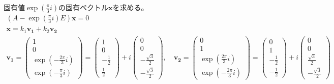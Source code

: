 \documentclass[10pt,b5paper]{ltjsarticle}
\begin{document}
固有値$\exp{(\frac{\pi}{3}i)}$の固有ベクトル$\bm{x}$を求める。
\begin{gather}
 \left( A-\exp{(\frac{\pi}{3}i)} E \right)\bm{x} =0\\
 \bm{x}= k_1 \bm{v_1} + k_2 \bm{v_2}\\
 \bm{v_1}=
 \begin{pmatrix}
  1\\0\\\exp{(-\frac{2\pi}{3}i)}\\\exp{(-\frac{\pi}{3}i)}
 \end{pmatrix}
 =
 \begin{pmatrix}
  1\\0\\-\frac{1}{2}\\\frac{1}{2}
 \end{pmatrix}
 +i
 \begin{pmatrix}
  0\\0\\-\frac{\sqrt{3}}{2}\\-\frac{\sqrt{3}}{2}
 \end{pmatrix}
 , \quad
 \bm{v_2}=
 \begin{pmatrix}
  0\\1\\\exp{(\frac{2\pi}{3}i)}\\\exp{(-\frac{2\pi}{3}i)}
 \end{pmatrix}
 =
 \begin{pmatrix}
  0\\1\\-\frac{1}{2}\\-\frac{1}{2}
 \end{pmatrix}
 +i
 \begin{pmatrix}
  0\\0\\\frac{\sqrt{3}}{2}\\-\frac{\sqrt{3}}{2}
 \end{pmatrix}
\end{gather}
\end{document}

